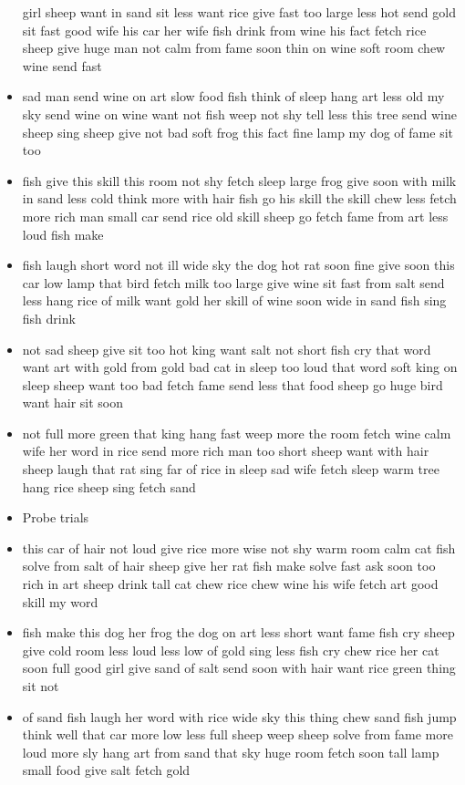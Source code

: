 \documentclass[10pt,letterpaper]{article}
\begin{document}
\begin{flushleft}
\begin{itemize}
girl
sheep
want
in
sand
sit
less
want
rice
give
fast
too
large
less
hot
send
gold
sit
fast
good
wife
his
car
her
wife
fish
drink
from
wine
his
fact
fetch
rice
sheep
give
huge
man
not
calm
from
fame
soon
thin
on
wine
soft
room
chew
wine
send
fast
  \item sad
man
send
wine
on
art
slow
food
fish
think
of
sleep
hang
art
less
old
my
sky
send
wine
on
wine
want
not
fish
weep
not
shy
tell
less
this
tree
send
wine
sheep
sing
sheep
give
not
bad
soft
frog
this
fact
fine
lamp
my
dog
of
fame
sit
too
  \item fish
give
this
skill
this
room
not
shy
fetch
sleep
large
frog
give
soon
with
milk
in
sand
less
cold
think
more
with
hair
fish
go
his
skill
the
skill
chew
less
fetch
more
rich
man
small
car
send
rice
old
skill
sheep
go
fetch
fame
from
art
less
loud
fish
make
  \item fish
laugh
short
word
not
ill
wide
sky
the
dog
hot
rat
soon
fine
give
soon
this
car
low
lamp
that
bird
fetch
milk
too
large
give
wine
sit
fast
from
salt
send
less
hang
rice
of
milk
want
gold
her
skill
of
wine
soon
wide
in
sand
fish
sing
fish
drink
  \item not
sad
sheep
give
sit
too
hot
king
want
salt
not
short
fish
cry
that
word
want
art
with
gold
from
gold
bad
cat
in
sleep
too
loud
that
word
soft
king
on
sleep
sheep
want
too
bad
fetch
fame
send
less
that
food
sheep
go
huge
bird
want
hair
sit
soon
  \item not
full
more
green
that
king
hang
fast
weep
more
the
room
fetch
wine
calm
wife
her
word
in
rice
send
more
rich
man
too
short
sheep
want
with
hair
sheep
laugh
that
rat
sing
far
of
rice
in
sleep
sad
wife
fetch
sleep
warm
tree
hang
rice
sheep
sing
fetch
sand
  \item Probe trials
  \item this
car
of
hair
not
loud
give
rice
more
wise
not
shy
warm
room
calm
cat
fish
solve
from
salt
of
hair
sheep
give
her
rat
fish
make
solve
fast
ask
soon
too
rich
in
art
sheep
drink
tall
cat
chew
rice
chew
wine
his
wife
fetch
art
good
skill
my
word
  \item fish
make
this
dog
her
frog
the
dog
on
art
less
short
want
fame
fish
cry
sheep
give
cold
room
less
loud
less
low
of
gold
sing
less
fish
cry
chew
rice
her
cat
soon
full
good
girl
give
sand
of
salt
send
soon
with
hair
want
rice
green
thing
sit
not
  \item of
sand
fish
laugh
her
word
with
rice
wide
sky
this
thing
chew
sand
fish
jump
think
well
that
car
more
low
less
full
sheep
weep
sheep
solve
from
fame
more
loud
more
sly
hang
art
from
sand
that
sky
huge
room
fetch
soon
tall
lamp
small
food
give
salt
fetch
gold
  

\end{itemize}
\end{flushleft}
\end{document}
